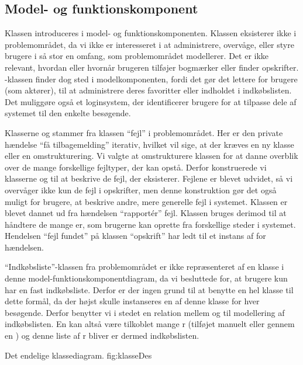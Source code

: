 \subsection{Model- og funktionskomponent}
\label{sec:modelfunktion}
% 

Klassen  introduceres i model- og funktionskomponenten. Klassen eksisterer ikke i problemområdet, da vi ikke er interesseret i at administrere, overvåge, eller styre brugere i så stor en omfang, som problemområdet modellerer. Det er \fx ikke relevant, hvordan eller hvornår brugeren tilføjer bogmærker eller finder opskrifter. -klassen finder dog sted i modelkomponenten, fordi det gør det lettere for brugere (som aktører), til \fx at administrere deres favoritter eller indholdet i indkøbslisten. Det muliggøre også et loginsystem, der identificerer brugere for at tilpasse dele af systemet til den enkelte besøgende.

Klasserne  og  stammer fra klassen ``fejl'' i problemområdet. Her er den private hændelse ``få tilbagemelding'' iterativ, hvilket vil sige, at der kræves en ny klasse eller en omstrukturering. Vi valgte at omstrukturere klassen for at danne overblik over de mange forskellige fejltyper, der kan opstå. Derfor konstruerede vi klasserne  og  til at beskrive de fejl, der eksisterer. Fejlene er blevet udvidet, så vi overvåger ikke kun de fejl i opskrifter, men denne konstruktion gør det også muligt for brugere, at beskrive andre, mere generelle fejl i systemet. Klassen  er blevet dannet ud fra hændelsen ``rapport\'{e}r'' fejl. Klassen  bruges derimod til at håndtere de mange er, som brugerne kan oprette fra forskellige steder i systemet. Hendelsen ``fejl fundet'' på klassen ``opskrift'' har \fx ledt til et instans af  for hændelsen. 

``Indkøbsliste''-klassen fra problemområdet er ikke repræsenteret af en klasse i denne model-funktionskomponentdiagram, da vi besluttede for, at brugere kun har en fast indkøbsliste. Derfor er der ingen grund til at benytte en hel klasse til dette formål, da der højst skulle instanseres en af denne klasse for hver besøgende. Derfor benytter vi i stedet en relation mellem  og  til modellering af indkøbslisten. En  kan altså være tilkoblet mange r (tilføjet manuelt eller gennem en ) og denne liste af r bliver er dermed indkøbslisten.


	{Det endelige klassediagram.}
	{fig:klasseDes}
